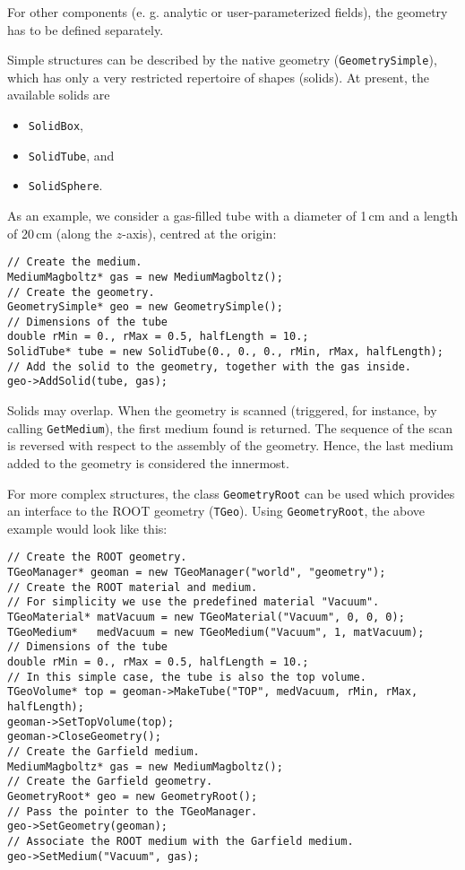 For other components (e. g. analytic or user-parameterized fields), 
the geometry has to be defined separately. 

Simple structures can be described by the native geometry (\texttt{GeometrySimple}), which has only a very restricted repertoire of shapes (solids). 
At present, the available solids are
\begin{itemize}
  \item
  \texttt{SolidBox}, 
  \item
  \texttt{SolidTube}, and
  \item
  \texttt{SolidSphere}.
\end{itemize} 

As an example, we consider a gas-filled tube with a diameter of 1\,cm and 
a length of 20\,cm (along the \(z\)-axis), centred at the origin:
\begin{lstlisting}
// Create the medium.
MediumMagboltz* gas = new MediumMagboltz();
// Create the geometry.
GeometrySimple* geo = new GeometrySimple();
// Dimensions of the tube
double rMin = 0., rMax = 0.5, halfLength = 10.;
SolidTube* tube = new SolidTube(0., 0., 0., rMin, rMax, halfLength);
// Add the solid to the geometry, together with the gas inside.
geo->AddSolid(tube, gas);
\end{lstlisting}

Solids may overlap. 
When the geometry is scanned 
(triggered, for instance, by calling \texttt{GetMedium}), the  
first medium found is returned. 
The sequence of the scan is reversed with respect to the 
assembly of the geometry. 
Hence, the last medium added to the geometry is considered the innermost. 

For more complex structures, the class \texttt{GeometryRoot} can be used 
which provides an interface to the ROOT geometry (\texttt{TGeo}).
Using \texttt{GeometryRoot}, the above example would look like this:
\begin{lstlisting}
// Create the ROOT geometry.
TGeoManager* geoman = new TGeoManager("world", "geometry");
// Create the ROOT material and medium. 
// For simplicity we use the predefined material "Vacuum".
TGeoMaterial* matVacuum = new TGeoMaterial("Vacuum", 0, 0, 0);
TGeoMedium*   medVacuum = new TGeoMedium("Vacuum", 1, matVacuum);
// Dimensions of the tube
double rMin = 0., rMax = 0.5, halfLength = 10.;
// In this simple case, the tube is also the top volume.
TGeoVolume* top = geoman->MakeTube("TOP", medVacuum, rMin, rMax, halfLength);
geoman->SetTopVolume(top);
geoman->CloseGeometry();
// Create the Garfield medium.
MediumMagboltz* gas = new MediumMagboltz();
// Create the Garfield geometry.
GeometryRoot* geo = new GeometryRoot();
// Pass the pointer to the TGeoManager.
geo->SetGeometry(geoman);
// Associate the ROOT medium with the Garfield medium.
geo->SetMedium("Vacuum", gas); 
\end{lstlisting} 

